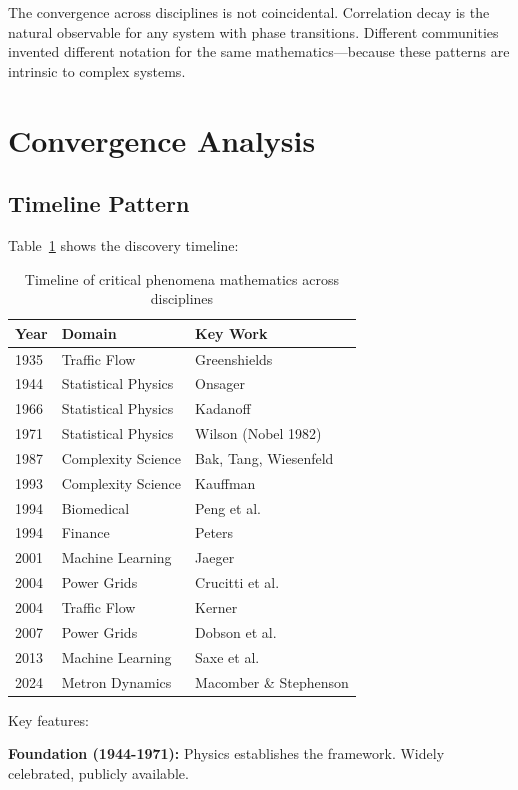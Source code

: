 \documentclass[11pt]{article}
\begin{document}
The convergence across disciplines is not coincidental. Correlation decay is the natural observable for any system with phase transitions. Different communities invented different notation for the same mathematics---because these patterns are intrinsic to complex systems.

\section{Convergence Analysis}

\subsection{Timeline Pattern}

Table~\ref{tab:timeline} shows the discovery timeline:

\begin{table}[h]
\centering
\caption{Timeline of critical phenomena mathematics across disciplines}
\label{tab:timeline}
\begin{tabular}{lll}
\toprule
\textbf{Year} & \textbf{Domain} & \textbf{Key Work} \\
\midrule
1935 & Traffic Flow & Greenshields \\
1944 & Statistical Physics & Onsager \\
1966 & Statistical Physics & Kadanoff \\
1971 & Statistical Physics & Wilson (Nobel 1982) \\
1987 & Complexity Science & Bak, Tang, Wiesenfeld \\
1993 & Complexity Science & Kauffman \\
1994 & Biomedical & Peng et al. \\
1994 & Finance & Peters \\
2001 & Machine Learning & Jaeger \\
2004 & Power Grids & Crucitti et al. \\
2004 & Traffic Flow & Kerner \\
2007 & Power Grids & Dobson et al. \\
2013 & Machine Learning & Saxe et al. \\
2024 & Metron Dynamics & Macomber \& Stephenson \\
\bottomrule
\end{tabular}
\end{table}

Key features:

\textbf{Foundation (1944-1971):} Physics establishes the framework. Widely celebrated, publicly available.
\end{document}
